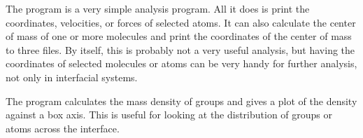The program {\tt {}} is a very simple analysis program. All it
does is print the coordinates, velocities, or forces of selected atoms.
It can also calculate the center of mass of one or more
molecules and print the coordinates of the center of mass to three
files. By itself, this is probably not a very useful analysis, but
having the coordinates of selected molecules or atoms can be very
handy for further analysis, not only in interfacial systems.

The program {\tt {}} calculates the mass density of
groups and gives a plot of the density against a box
axis. This is useful for looking at the distribution of groups or
atoms across the interface.





